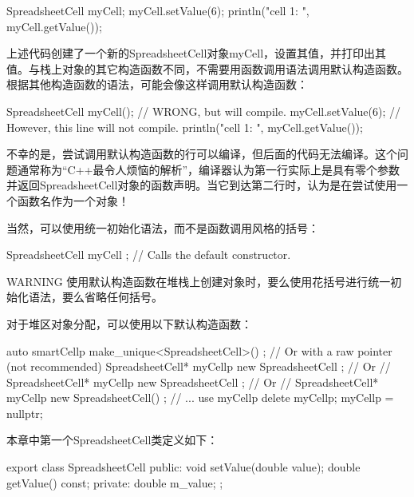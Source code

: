 \begin{cpp}
SpreadsheetCell myCell;
myCell.setValue(6);
println("cell 1: {}", myCell.getValue());
\end{cpp}

上述代码创建了一个新的SpreadsheetCell对象myCell，设置其值，并打印出其值。与栈上对象的其它构造函数不同，不需要用函数调用语法调用默认构造函数。根据其他构造函数的语法，可能会像这样调用默认构造函数：

\begin{cpp}
SpreadsheetCell myCell(); // WRONG, but will compile.
myCell.setValue(6); // However, this line will not compile.
println("cell 1: {}", myCell.getValue());
\end{cpp}

不幸的是，尝试调用默认构造函数的行可以编译，但后面的代码无法编译。这个问题通常称为“C++最令人烦恼的解析”，编译器认为第一行实际上是具有零个参数并返回SpreadsheetCell对象的函数声明。当它到达第二行时，认为是在尝试使用一个函数名作为一个对象！

当然，可以使用统一初始化语法，而不是函数调用风格的括号：

\begin{cpp}
SpreadsheetCell myCell { }; // Calls the default constructor.
\end{cpp}

\begin{myWarning}{WARNING}
使用默认构造函数在堆栈上创建对象时，要么使用花括号进行统一初始化语法，要么省略任何括号。
\end{myWarning}

对于堆区对象分配，可以使用以下默认构造函数：

\begin{cpp}
auto smartCellp { make_unique<SpreadsheetCell>() };
// Or with a raw pointer (not recommended)
SpreadsheetCell* myCellp { new SpreadsheetCell { } };
// Or
// SpreadsheetCell* myCellp { new SpreadsheetCell };
// Or
// SpreadsheetCell* myCellp { new SpreadsheetCell() };
// ... use myCellp
delete myCellp; myCellp = nullptr;
\end{cpp}


本章中第一个SpreadsheetCell类定义如下：

\begin{cpp}
export class SpreadsheetCell
{
    public:
        void setValue(double value);
        double getValue() const;
    private:
        double m_value;
};
\end{cpp}


